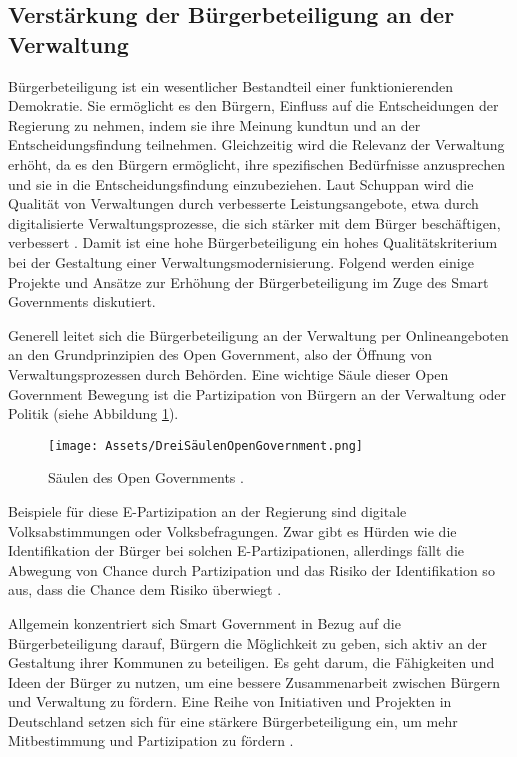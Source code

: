 \subsection{Verstärkung der Bürgerbeteiligung an der Verwaltung}
Bürgerbeteiligung ist ein wesentlicher Bestandteil einer funktionierenden Demokratie. 
Sie ermöglicht es den Bürgern, Einfluss auf die Entscheidungen der Regierung zu nehmen, indem sie ihre Meinung kundtun und an der Entscheidungsfindung teilnehmen.
Gleichzeitig wird die Relevanz der Verwaltung erhöht, da es den Bürgern ermöglicht, ihre spezifischen Bedürfnisse anzusprechen und sie in die Entscheidungsfindung einzubeziehen.
Laut Schuppan wird die Qualität von Verwaltungen durch verbesserte Leistungsangebote, etwa durch digitalisierte Verwaltungsprozesse, die sich stärker mit dem Bürger beschäftigen, verbessert \citep[Vgl.][S.35]{Schuppan2016}.
Damit ist eine hohe Bürgerbeteiligung ein hohes Qualitätskriterium bei der Gestaltung einer Verwaltungsmodernisierung.
Folgend werden einige Projekte und Ansätze zur Erhöhung der Bürgerbeteiligung im Zuge des Smart Governments diskutiert.
\par
Generell leitet sich die Bürgerbeteiligung an der Verwaltung per Onlineangeboten an den Grundprinzipien des Open Government, also der Öffnung von Verwaltungsprozessen durch Behörden.
Eine wichtige Säule dieser Open Government Bewegung ist die Partizipation von Bürgern an der Verwaltung oder Politik (siehe Abbildung \ref{fig:DreiSäulenOpenGovernment}).
\begin{figure}[h]
 \centering
 \texttt{[image: Assets/DreiSäulenOpenGovernment.png]}
 \caption{Säulen des Open Governments \citep[][]{Leitner2018}.}
 \label{fig:DreiSäulenOpenGovernment}
\end{figure}
Beispiele für diese E-Partizipation an der Regierung sind digitale Volksabstimmungen oder Volksbefragungen.
Zwar gibt es Hürden wie die Identifikation der Bürger bei solchen E-Partizipationen, allerdings fällt die Abwegung von Chance durch Partizipation und das Risiko der Identifikation so aus, dass die Chance dem Risiko überwiegt \citep[][S. 15]{Leitner2018}.
\par
Allgemein konzentriert sich Smart Government in Bezug auf die Bürgerbeteiligung darauf, Bürgern die Möglichkeit zu geben, sich aktiv an der Gestaltung ihrer Kommunen zu beteiligen. 
Es geht darum, die Fähigkeiten und Ideen der Bürger zu nutzen, um eine bessere Zusammenarbeit zwischen Bürgern und Verwaltung zu fördern.  
Eine Reihe von Initiativen und Projekten in Deutschland setzen sich für eine stärkere Bürgerbeteiligung ein, um mehr Mitbestimmung und Partizipation zu fördern \citep[][S. 18, 49-50]{Leitner2018}.
